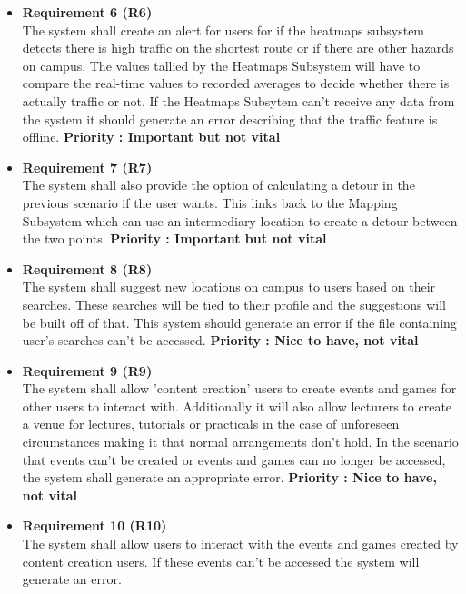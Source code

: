 \documentclass[english]{article}
\begin{document}
\begin{itemize}
						    \item \textbf{Requirement 6 (R6)}\\ The system shall create an alert for users for if the heatmaps subsystem detects there is high traffic on the shortest route or if there are other hazards on campus. The values tallied by the Heatmaps Subsystem will have to compare the real-time values to recorded averages to decide whether there is actually traffic or not. If the Heatmaps Subsytem can't receive any data from the system it should generate an error describing that the traffic feature is offline. \textbf{Priority : Important but not vital}
						    \item \textbf{Requirement 7 (R7)}\\ The system shall also provide the option of calculating a detour in the previous scenario if the user wants. This links back to the Mapping Subsystem which can use an intermediary location to create a detour between the two points. \textbf{Priority : Important but not vital}
						    \item \textbf{Requirement 8 (R8)}\\ The system shall suggest new locations on campus to users based on their searches. These searches will be tied to their profile and the suggestions will be built off of that. This system should generate an error if the file containing user's searches can't be accessed. \textbf{Priority : Nice to have, not vital}
						    \item \textbf{Requirement 9 (R9)}\\ The system shall allow 'content creation' users to create events and games for other users to interact with. Additionally it will also allow lecturers to create a venue for lectures, tutorials or practicals in the case of unforeseen circumstances making it that normal arrangements don't hold. In the scenario that events can't be created or events and games can no longer be accessed, the system shall generate an appropriate error. 
						    \textbf{Priority : Nice to have, not vital}
						    \item \textbf{Requirement 10 (R10)} \\ The system shall allow users to interact with the events and games created by content creation users. If these events can't be accessed the system will generate an error.
						\end{itemize}
\end{document}
